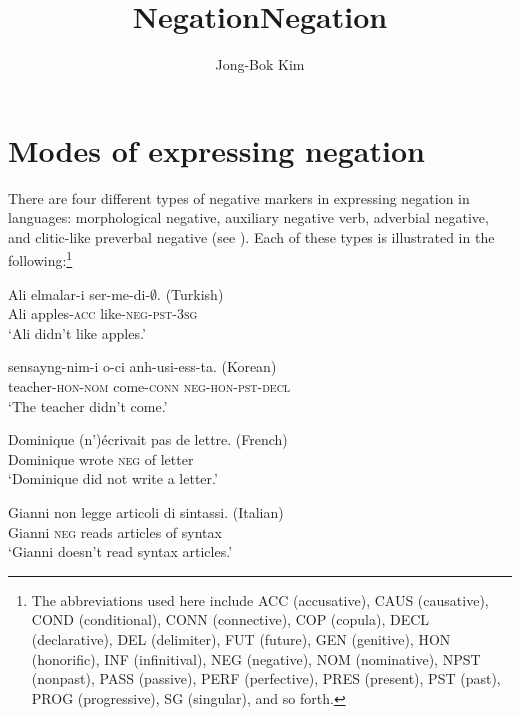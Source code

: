 \documentclass[output=paper
                ,modfonts
                		,nonflat
	        ,collection
	        ,collectionchapter
	        ,collectiontoclongg
 	        ,biblatex
                ,babelshorthands
                ,newtxmath
                ,draftmode
                ,colorlinks, citecolor=brown
]{./langsci/langscibook}
\author{Jong-Bok Kim\affiliation{Kyung Hee University, Seoul}}
\title{Negation}
\title{Negation}
\begin{document}
\maketitle

{

\section{Modes of expressing negation}


There are four different types of negative markers
in expressing negation in languages: morphological negative,
auxiliary negative verb, adverbial negative, and clitic-like
 preverbal negative (see \citealt{Dahl:79, Payne:85, Dryer:05}).
Each of these types is illustrated in the following:\footnote{The abbreviations
used here include ACC (accusative), CAUS (causative), COND (conditional), CONN (connective), COP (copula),  DECL (declarative), DEL (delimiter), FUT (future), GEN (genitive), HON (honorific), INF (infinitival), NEG (negative), NOM (nominative), NPST (nonpast), PASS (passive), PERF (perfective), PRES (present), PST (past),   PROG (progressive),  SG (singular), and so forth.}

\eal
\ex\label{1a}
\gll Ali  elmalar-i  ser-me-di-$\emptyset$. \hfill (Turkish) \\
Ali apples-\textsc{acc}  like-\textsc{neg}-\textsc{pst}-\textsc{3sg} \\
\glt `Ali didn't like apples.'

\ex\label{1b}
\gll sensayng-nim-i o-ci anh-usi-ess-ta.  \hfill (Korean) \\
teacher-\textsc{hon}-\textsc{nom} come-\textsc{conn} \textsc{neg}-\textsc{hon}-\textsc{pst}-\textsc{decl} \\
\glt `The teacher didn't come.'

\ex \label{1c}
\gll Dominique (n')\'{e}crivait pas de lettre. \hfill (French)\\
     Dominique wrote \textsc{neg} of letter \\
\glt `Dominique did not write a letter.'

\ex \label{1d} %
\gll Gianni non legge articoli di sintassi. \hfil (Italian) \\
Gianni \textsc{neg} reads articles of syntax \\
\glt `Gianni doesn't read syntax articles.'
\zl

}
\end{document}
